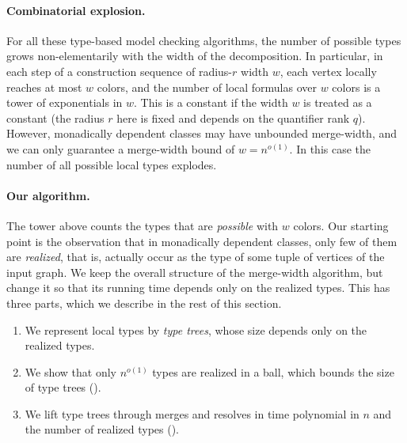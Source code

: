 \paragraph{Combinatorial explosion.}
For all these type-based model checking algorithms, the number of possible types grows non-elementarily with the width of the decomposition.
In particular, in each step of a construction sequence of radius-$r$ width $w$, each vertex locally reaches at most $w$ colors, and the number of local formulas over $w$ colors is a tower of exponentials in $w$.
This is a constant if the width \(w\) is treated as a constant (the radius $r$ here is fixed and depends on the quantifier rank $q$).
However, monadically dependent classes may have unbounded merge-width, and we can only guarantee a merge-width bound of \(w = n^{o(1)}\).
In this case the number of all possible local types explodes.

\paragraph{Our algorithm.}
The tower above counts the types that are \emph{possible} with $w$ colors.
Our starting point is the observation that in monadically dependent classes, only few of them are \emph{realized}, that is, actually occur as the type of some tuple of vertices of the input graph.
We keep the overall structure of the merge-width algorithm, but change it so that its running time depends only on the realized types.
This has three parts, which we describe in the rest of this section.
\begin{enumerate}
  \item We represent local types by \emph{type trees}, whose size depends only on the realized types.
  \item We show that only $n^{o(1)}$ types are realized in a ball, which bounds the size of type trees ().
  \item We lift type trees through merges and resolves in time polynomial in $n$ and the number of realized types ().
\end{enumerate}

